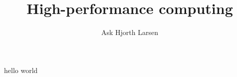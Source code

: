 \documentclass{beamer}
\author{Ask Hjorth Larsen}
\begin{document}
\title{High-performance computing}
  hello world
\end{document}
